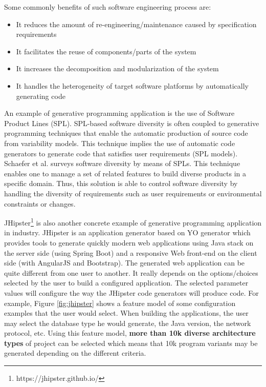 Some commonly benefits of such software engineering process are:
\begin{itemize}
\item It reduces the amount of re-engineering/maintenance caused by specification requirements
\item It facilitates the reuse of components/parts of the system
\item It increases the decomposition and modularization of the system
\item It handles the heterogeneity of target software platforms by automatically generating code
\end{itemize}


An example of generative programming application is the use of Software Product Lines (SPL).
SPL-based software diversity is often coupled to generative programming techniques\cite{Czarnecki:2000:GPM:345203} that enable the automatic production of source code from variability models. This technique implies the use of automatic code generators to generate code that satisfies user requirements (SPL models).
Schaefer et al.\cite{schaefer2012software} surveys software diversity by means of SPLs. This technique enables one to manage a set of related features to build diverse products in a specific domain. Thus, this solution is able to control software diversity by handling the diversity of requirements such as user requirements or environmental constraints or changes. 

JHipster\footnote{https://jhipster.github.io/} is also another concrete example of generative programming application in industry. JHipster is an application generator based on YO generator which provides tools to generate quickly modern web applications using Java stack on the server side (using Spring Boot) and a responsive Web front-end on the client side (with AngularJS and Bootstrap).
The generated web application can be quite different from one user to another. It really depends on the options/choices selected by the user to build a configured application. The selected parameter values will configure the way the JHipster code generators will produce code. 
For example, Figure \ref{fig:jhipster} shows a feature model of some configuration examples that the user would select. When building the applications, the user may select the database type he would generate, the Java version, the network protocol, etc. 
Using this feature model, \textbf{more than 10k diverse architecture types} of project can be selected which means that 10k program variants may be generated depending on the different criteria.

